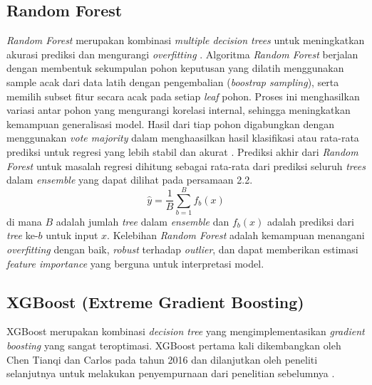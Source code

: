     
    \subsection{Random Forest}
    \textit{Random Forest} merupakan kombinasi \textit{multiple decision trees} untuk meningkatkan akurasi prediksi dan mengurangi \textit{overfitting} \cite{Breiman2001}. Algoritma \textit{Random Forest} berjalan dengan membentuk sekumpulan pohon keputusan yang dilatih menggunakan sample acak dari data latih dengan pengembalian (\textit{boostrap sampling}), serta memilih subset fitur secara acak pada setiap \textit{leaf} pohon. Proses ini menghasilkan variasi antar pohon yang  mengurangi korelasi internal, sehingga meningkatkan kemampuan generalisasi model. Hasil dari tiap pohon digabungkan dengan menggunakan \textit{vote majority} dalam menghaasilkan hasil klasifikasi atau rata-rata prediksi untuk regresi yang lebih stabil dan akurat \cite{MontesinosLópez2022}. Prediksi akhir dari \textit{Random Forest} untuk masalah regresi dihitung sebagai rata-rata dari prediksi seluruh \textit{trees} dalam \textit{ensemble} yang dapat dilihat pada persamaan 2.2.
    \begin{equation}
        \hat{y} = \frac{1}{B} \sum_{b=1}^{B} f_b(x)
    \end{equation}
    di mana $B$ adalah jumlah \textit{tree} dalam \textit{ensemble} dan $f_b(x)$ adalah prediksi dari \textit{tree} ke-$b$ untuk input $x$. Kelebihan \textit{Random Forest} adalah kemampuan menangani \textit{overfitting} dengan baik, \textit{robust} terhadap \textit{outlier}, dan dapat memberikan estimasi \textit{feature importance} yang berguna untuk interpretasi model.

    
    
    \subsection{XGBoost (Extreme Gradient Boosting)}
    XGBoost merupakan kombinasi \textit{decision tree } yang mengimplementasikan \textit{gradient boosting} yang sangat teroptimasi. XGBoost pertama kali dikembangkan oleh Chen Tianqi dan Carlos pada tahun 2016 dan dilanjutkan oleh peneliti selanjutnya untuk melakukan penyempurnaan dari penelitian sebelumnya \cite{10.1371/journal.pone.0283452}. 
    
